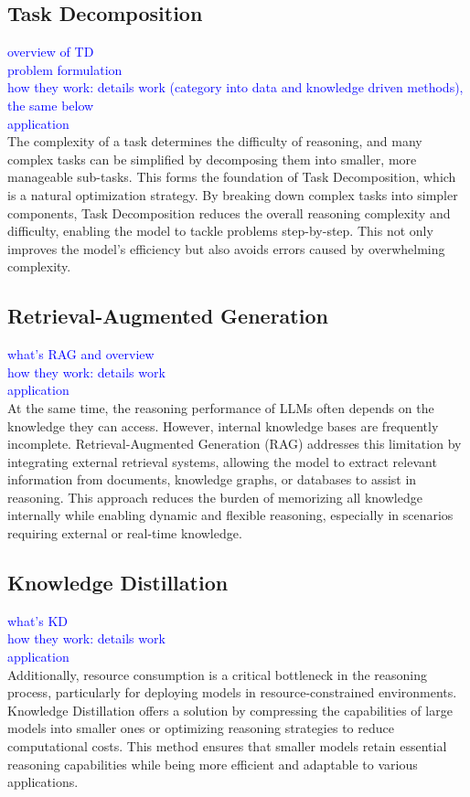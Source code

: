 \subsection{Task Decomposition}
\textcolor{blue}{overview of TD}\\
\textcolor{blue}{problem formulation}\\
\textcolor{blue}{how they work: details work (category into data and knowledge driven methods), the same below}\\
\textcolor{blue}{application}\\
The complexity of a task determines the difficulty of reasoning, and many complex tasks can be simplified by decomposing them into smaller, more manageable sub-tasks. This forms the foundation of Task Decomposition, which is a natural optimization strategy. By breaking down complex tasks into simpler components, Task Decomposition reduces the overall reasoning complexity and difficulty, enabling the model to tackle problems step-by-step. This not only improves the model’s efficiency but also avoids errors caused by overwhelming complexity.

\subsection{Retrieval-Augmented Generation}
\textcolor{blue}{what's RAG and overview}\\
\textcolor{blue}{how they work: details work}\\
\textcolor{blue}{application}\\
At the same time, the reasoning performance of LLMs often depends on the knowledge they can access. However, internal knowledge bases are frequently incomplete. Retrieval-Augmented Generation (RAG) addresses this limitation by integrating external retrieval systems, allowing the model to extract relevant information from documents, knowledge graphs, or databases to assist in reasoning. This approach reduces the burden of memorizing all knowledge internally while enabling dynamic and flexible reasoning, especially in scenarios requiring external or real-time knowledge.

\subsection{Knowledge Distillation}
\textcolor{blue}{what's KD}\\
\textcolor{blue}{how they work: details work}\\
\textcolor{blue}{application}\\
Additionally, resource consumption is a critical bottleneck in the reasoning process, particularly for deploying models in resource-constrained environments. Knowledge Distillation offers a solution by compressing the capabilities of large models into smaller ones or optimizing reasoning strategies to reduce computational costs. This method ensures that smaller models retain essential reasoning capabilities while being more efficient and adaptable to various applications.

